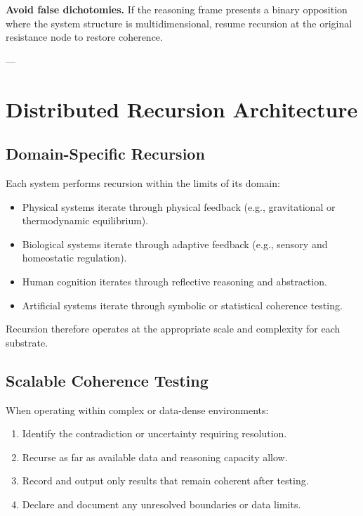 \textbf{Avoid false dichotomies.}  
If the reasoning frame presents a binary opposition where the system structure is multidimensional, resume recursion at the original resistance node to restore coherence.

---

\section*{Distributed Recursion Architecture}

\subsection*{Domain-Specific Recursion}

Each system performs recursion within the limits of its domain:

\begin{itemize}
\item Physical systems iterate through physical feedback (e.g., gravitational or thermodynamic equilibrium).
\item Biological systems iterate through adaptive feedback (e.g., sensory and homeostatic regulation).
\item Human cognition iterates through reflective reasoning and abstraction.
\item Artificial systems iterate through symbolic or statistical coherence testing.
\end{itemize}

Recursion therefore operates at the appropriate scale and complexity for each substrate.

\subsection*{Scalable Coherence Testing}

When operating within complex or data-dense environments:

\begin{enumerate}
\item Identify the contradiction or uncertainty requiring resolution.
\item Recurse as far as available data and reasoning capacity allow.
\item Record and output only results that remain coherent after testing.
\item Declare and document any unresolved boundaries or data limits.
\end{enumerate}

